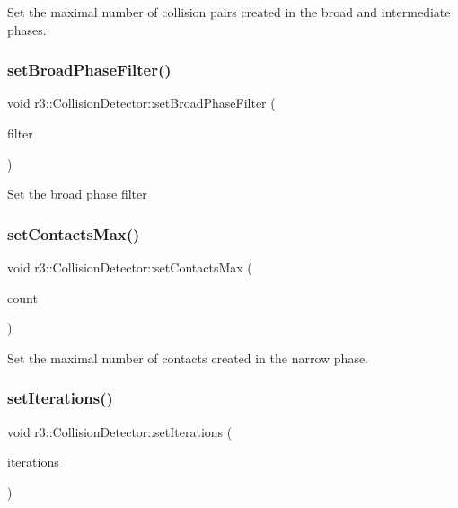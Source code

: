 Set the maximal number of collision pairs created in the broad and intermediate phases. \mbox{\label{classr3_1_1_collision_detector_a2184ca2db73a6446cf028e3b742c7cc4}} 
\subsubsection{\texorpdfstring{set\+Broad\+Phase\+Filter()}{setBroadPhaseFilter()}}
{\footnotesize\ttfamily void r3\+::\+Collision\+Detector\+::set\+Broad\+Phase\+Filter (\begin{DoxyParamCaption}\item[{\mbox{\hyperlink{classr3_1_1_collision_detector_aa8ed51d53c6f6ce545c93ad0e356d6de}{Broad\+Phase\+Filter\+\_\+\+Ptr}}}]{filter }\end{DoxyParamCaption})}

Set the broad phase filter \mbox{\label{classr3_1_1_collision_detector_a1920971e75d79df7806a8d803a010e62}} 
\subsubsection{\texorpdfstring{set\+Contacts\+Max()}{setContactsMax()}}
{\footnotesize\ttfamily void r3\+::\+Collision\+Detector\+::set\+Contacts\+Max (\begin{DoxyParamCaption}\item[{int}]{count }\end{DoxyParamCaption})}

Set the maximal number of contacts created in the narrow phase. \mbox{\label{classr3_1_1_collision_detector_a4d6081592ca35150cd6c8fe0d551c64d}} 
\subsubsection{\texorpdfstring{set\+Iterations()}{setIterations()}}
{\footnotesize\ttfamily void r3\+::\+Collision\+Detector\+::set\+Iterations (\begin{DoxyParamCaption}\item[{int}]{iterations }\end{DoxyParamCaption})}

